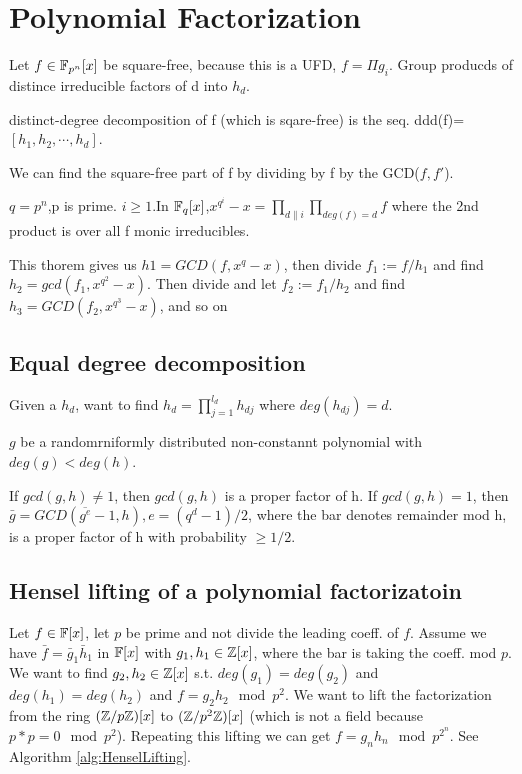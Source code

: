 \section{Polynomial Factorization}


Let $f\in \mathbb F_{p^n}[x]$ be square-free, because this is a UFD, $f = \Pi g_i$. Group producds of distince  irreducible factors of d into $h_d$.

\begin{definition}
	distinct-degree decomposition of f (which is sqare-free) is the seq. ddd(f)=$[h_1, h_2, \cdots, h_d]$.
\end{definition}

We can find the square-free part of f by dividing by f by the GCD($f,f'$).


\begin{theorem}
	$q=p^n$,p is prime. $i \geq1$.In $\mathbb F_q[x]$,$x^{q^i}-x=\prod\limits_{d\|i} \prod\limits_{deg(f)=d}f$ where the 2nd product is over all f monic irreducibles.
\end{theorem}

This thorem gives us $h1=GCD(f, x^q-x)$, then divide $f_1:=f/h_1$ and find $h_2=gcd(f_1,x^{q^2}-x)$. Then divide and let $f_2:=f_1/h_2$ and find $h_3=GCD(f_2, x^{q^3}-x)$, and so on


\subsection{Equal degree decomposition}

Given a $h_d$, want to find $h_d =\prod\limits_{j=1}^{l_d}h_{dj}$ where $deg(h_{dj})=d$.


\begin{theorem}
	$g$ be a randomrniformly  distributed non-constannt  polynomial with $deg(g) < deg(h)$.
	
	If $gcd(g,h)\neq1$, then $gcd(g,h)$  is a proper factor of h.
	If $gcd(g,h)=1$, then $\bar g=GCD(\overline{g^e}-1,h), e=(q^d-1)/2$, where the bar denotes remainder mod h, is a proper factor of h with probability $\geq 1/2$.
\end{theorem}


\subsection{Hensel lifting of a polynomial factorizatoin}


Let $f\in\mathbb F[x]$, let $p$ be prime and not divide the leading coeff. of $f$. Assume we have $\bar f = \bar g_1 \bar h_1$ in $\mathbb F[x]$ with $g_1, h_1 \in \mathbb Z[x]$, where the bar is taking the coeff. mod $p$. We want to find $g_2,h_2 \in \mathbb Z[x]$ s.t. $deg(g_1)=deg(g_2)$ and $deg(h_1)=deg(h_2)$ and $f = g_2h_2 \mod p^2$. We want to lift the factorization from the ring $(\mathbb Z/p\mathbb Z)[x]$ to $(\mathbb Z/p^2\mathbb Z)[x]$ (which is not a field because $p*p=0 \mod p^2$). Repeating this lifting we can get $f = g_n h_n \mod p^{2^n}$. See Algorithm \ref{alg:HenselLifting}.

